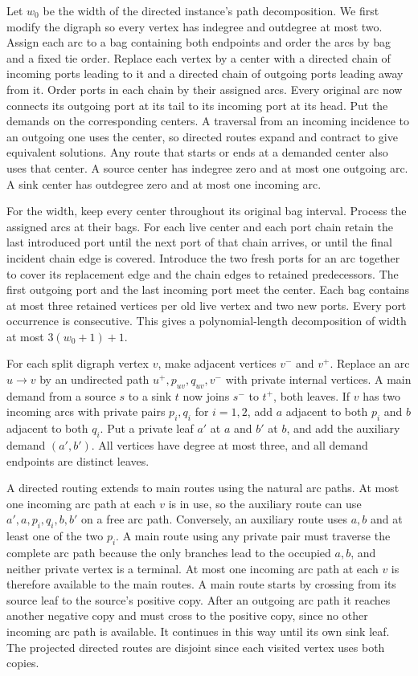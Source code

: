 \documentclass[11pt]{article}
\begin{document}
Let \(w_0\) be the width of the directed instance's path decomposition.
We first modify the digraph so every vertex has indegree and outdegree at most
two. Assign each arc to a bag containing both endpoints and order the arcs by
bag and a fixed tie order. Replace each vertex by a center with a directed
chain of incoming ports leading to it and a directed chain of outgoing ports
leading away from it. Order ports in each chain by their assigned arcs.
Every original arc now connects its outgoing port at its tail to its incoming
port at its head. Put the demands on the corresponding centers. A traversal
from an incoming incidence to an outgoing one uses the center, so directed
routes expand and contract to give equivalent solutions. Any route that
starts or ends at a demanded center also uses that center. A source center
has indegree zero and at most one outgoing arc. A sink center has outdegree
zero and at most one incoming arc.

For the width, keep every center throughout its original bag interval.
Process the assigned arcs at their bags. For each live center and each port
chain retain the last introduced port until the next port of that chain
arrives, or until the final incident chain edge is covered. Introduce the
two fresh ports for an arc together to cover its replacement edge and the
chain edges to retained predecessors. The first outgoing port and the last
incoming port meet the center. Each bag contains at most three retained
vertices per old live vertex and two new ports. Every port occurrence is
consecutive. This gives a polynomial-length decomposition of width at most
\(3(w_0+1)+1\).

For each split digraph vertex \(v\), make adjacent vertices \(v^-\) and
\(v^+\). Replace an arc \(u\to v\) by an undirected path
\(u^+,p_{uv},q_{uv},v^-\) with private internal vertices. A main demand
from a source \(s\) to a sink \(t\) now joins \(s^-\) to \(t^+\), both
leaves. If \(v\) has two incoming arcs with private pairs \(p_i,q_i\) for
\(i=1,2\), add \(a\) adjacent to both \(p_i\) and \(b\) adjacent to both
\(q_i\). Put a private leaf \(a'\) at \(a\) and \(b'\) at \(b\), and add
the auxiliary demand \((a',b')\). All vertices have degree at most three,
and all demand endpoints are distinct leaves.

A directed routing extends to main routes using the natural arc paths.
At most one incoming arc path at each \(v\) is in use, so the auxiliary
route can use \(a',a,p_i,q_i,b,b'\) on a free arc path. Conversely, an
auxiliary route uses \(a,b\) and at least one of the two \(p_i\). A main
route using any private pair must traverse the complete arc path because
the only branches lead to the occupied \(a,b\), and neither private vertex
is a terminal. At most one incoming arc path at each \(v\) is therefore
available to the main routes. A main route starts by crossing from its
source leaf to the source's positive copy. After an outgoing arc path
it reaches another negative copy and must cross to the positive copy,
since no other incoming arc path is available. It continues in this way
until its own sink leaf. The projected directed routes are disjoint since
each visited vertex uses both copies.
\end{document}
